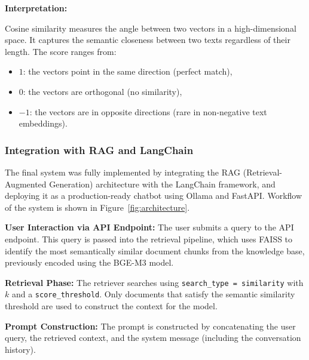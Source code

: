 \documentclass[conference]{IEEEtran}
\begin{document}
\textbf{Interpretation:}

Cosine similarity measures the angle between two vectors in a high-dimensional space. It captures the semantic closeness between two texts regardless of their length. The score ranges from:
\begin{itemize}
  \item $1$: the vectors point in the same direction (perfect match),
  \item $0$: the vectors are orthogonal (no similarity),
  \item $-1$: the vectors are in opposite directions (rare in non-negative text embeddings).
\end{itemize}

\subsubsection{Integration with RAG and LangChain}

The final system was fully implemented by integrating the RAG (Retrieval-Augmented Generation) architecture with the LangChain framework, and deploying it as a production-ready chatbot using Ollama and FastAPI. Workflow of the system is shown in Figure~\ref{fig:architecture}.

\noindent\textbf{User Interaction via API Endpoint:}
The user submits a query to the API endpoint. This query is passed into the retrieval pipeline, which uses FAISS to identify the most semantically similar document chunks from the knowledge base, previously encoded using the BGE-M3 model.

\noindent\textbf{Retrieval Phase:}
The retriever searches using \texttt{search\_type = similarity} with $k$ and a \texttt{score\_threshold}. Only documents that satisfy the semantic similarity threshold are used to construct the context for the model.

\noindent\textbf{Prompt Construction:}
The prompt is constructed by concatenating the user query, the retrieved context, and the system message (including the conversation history).
\end{document}
